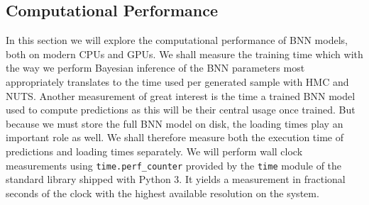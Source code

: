 \subsection{Computational Performance}
In this section we will explore the computational performance of BNN models, both on modern CPUs and GPUs. We shall measure the training time which with the way we perform Bayesian inference of the BNN parameters most appropriately translates to the time used per generated sample with HMC and NUTS. Another measurement of great interest is the time a trained BNN model used to compute predictions as this will be their central usage once trained. But because we must store the full BNN model on disk, the loading times play an important role as well. We shall therefore measure both the execution time of predictions and loading times separately.
We will perform wall clock measurements using {\tt time.perf\_counter} provided by the {\tt time} module of the standard library shipped with Python 3. It yields a measurement in fractional seconds of the clock with the highest available resolution on the system.

